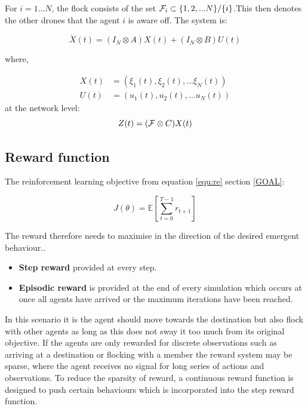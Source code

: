 \noindent
For $i = 1...N$, the flock consists of the set ${\cal{F}}_i \subset\{1,2,...N\}/\{i\}$.This then denotes the other drones that the agent $i$ is aware off. The system is:

\begin{equation}
\dot{X}(t)=(I_{N}\otimes A)X(t)+(I_{N}\otimes B)U(t)
\end{equation}

\noindent
where,

\begin{equation}
\begin{split}
    X(t) &= (\xi_1(t), \xi_2(t), ... \xi_N(t))\\
    U(t) &= (u_1(t), u_2(t), ... u_N(t))
    \end{split}
\end{equation}
\noindent
at the network level:
\begin{equation}
Z(t)=({\cal F}\otimes C)X(t)
\end{equation}


\subsection{Reward function}
The reinforcement learning objective from equation \ref{equ:re} section \ref{GOAL}:

\[J(\theta) = \mathbb{E}[\sum_{t=0}^{T-1} r_{t+1}]\]

The reward therefore needs to maximise in the direction of the desired emergent behaviour.\cite{rew1}.

\begin{itemize}
    \item \textbf{Step reward} provided at every step.
    \item \textbf{Episodic reward} is provided at the end of every simulation which occurs at once all agents have arrived or the maximum iterations have been reached. 
\end{itemize}

In this scenario it is the agent should move towards the destination but also flock with other agents as long as this does not sway it too much from its original objective. If the agents are only rewarded for discrete observations such as arriving at a destination or flocking with a member the reward system may be sparse, where the agent receives no signal for long series of actions and observations. To reduce the sparsity of reward, a continuous reward function is designed to push certain behaviours which is incorporated into the step reward function. \cite{shaping}
\clearpage
